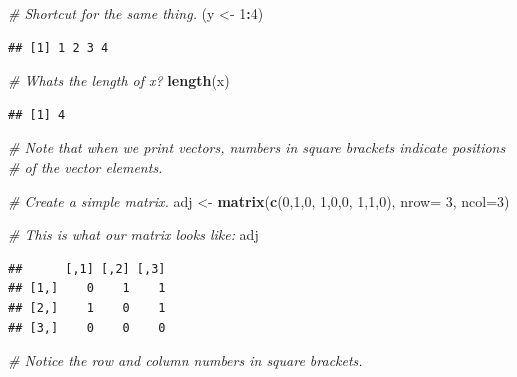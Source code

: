 \documentclass[
]{book}
\newenvironment{Shaded}{\begin{snugshade}}{\end{snugshade}}
\newcommand{\AttributeTok}[1]{\textcolor[rgb]{0.13,0.29,0.53}{#1}}
\newcommand{\CommentTok}[1]{\textcolor[rgb]{0.56,0.35,0.01}{\textit{#1}}}
\newcommand{\DecValTok}[1]{\textcolor[rgb]{0.00,0.00,0.81}{#1}}
\newcommand{\FunctionTok}[1]{\textcolor[rgb]{0.13,0.29,0.53}{\textbf{#1}}}
\newcommand{\NormalTok}[1]{#1}
\newcommand{\OtherTok}[1]{\textcolor[rgb]{0.56,0.35,0.01}{#1}}
\newcommand{\SpecialCharTok}[1]{\textcolor[rgb]{0.81,0.36,0.00}{\textbf{#1}}}
\begin{document}
\begin{Shaded}
\begin{Highlighting}[]
\CommentTok{\# Shortcut for the same thing.}
\NormalTok{(y }\OtherTok{\textless{}{-}} \DecValTok{1}\SpecialCharTok{:}\DecValTok{4}\NormalTok{)}
\end{Highlighting}
\end{Shaded}

\begin{verbatim}
## [1] 1 2 3 4
\end{verbatim}

\begin{Shaded}
\begin{Highlighting}[]
\CommentTok{\# What\textquotesingle{}s the length of x?}
\FunctionTok{length}\NormalTok{(x)}
\end{Highlighting}
\end{Shaded}

\begin{verbatim}
## [1] 4
\end{verbatim}

\begin{Shaded}
\begin{Highlighting}[]
\CommentTok{\# Note that when we print vectors, numbers in square brackets indicate positions}
\CommentTok{\# of the vector elements.}

\CommentTok{\# Create a simple matrix.}
\NormalTok{adj }\OtherTok{\textless{}{-}} \FunctionTok{matrix}\NormalTok{(}\FunctionTok{c}\NormalTok{(}\DecValTok{0}\NormalTok{,}\DecValTok{1}\NormalTok{,}\DecValTok{0}\NormalTok{, }\DecValTok{1}\NormalTok{,}\DecValTok{0}\NormalTok{,}\DecValTok{0}\NormalTok{, }\DecValTok{1}\NormalTok{,}\DecValTok{1}\NormalTok{,}\DecValTok{0}\NormalTok{), }\AttributeTok{nrow=} \DecValTok{3}\NormalTok{, }\AttributeTok{ncol=}\DecValTok{3}\NormalTok{)}

\CommentTok{\# This is what our matrix looks like:}
\NormalTok{adj}
\end{Highlighting}
\end{Shaded}

\begin{verbatim}
##      [,1] [,2] [,3]
## [1,]    0    1    1
## [2,]    1    0    1
## [3,]    0    0    0
\end{verbatim}

\begin{Shaded}
\begin{Highlighting}[]
\CommentTok{\# Notice the row and column numbers in square brackets. }
\end{Highlighting}
\end{Shaded}
\end{document}
